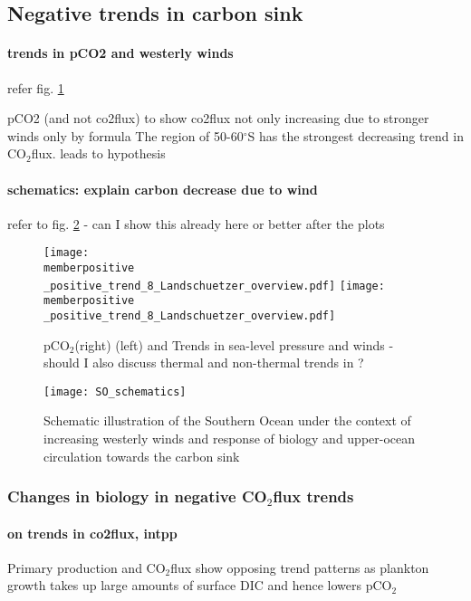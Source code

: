 \documentclass[12pt]{article}
\newcommand{\memberpositive}{m178_1985_1992} %
\begin{document}
\clearpage

\subsection{Negative trends in carbon sink}


\paragraph{trends in pCO2 and westerly winds} refer fig. \ref{fig:pco2_neg} 

pCO2 (and not co2flux) to show co2flux not only increasing due to stronger winds only by formula
 The region of 50-60$^\circ$S has the strongest decreasing trend in CO$_2$flux. leads to hypothesis
 
\paragraph{schematics: explain carbon decrease due to wind} refer to fig. \ref{fig:schematics_stronger_winds} - can I show this already here or better after the plots 



\begin{figure}[h!]
\centering
	\texttt{[image: \\memberpositive \_positive\_trend\_8\_Landschuetzer\_overview.pdf]}
	\texttt{[image: \\memberpositive \_positive\_trend\_8\_Landschuetzer\_overview.pdf]}	
	\caption{pCO$_2$(right) (left) and Trends in sea-level pressure and winds - should I also discuss thermal and non-thermal trends in \citep{landschuetzer2015}?}
	\label{fig:pco2_neg}
\end{figure}




\begin{figure}[h!]
	\centering
	\texttt{[image: SO\_schematics]}
	\caption{Schematic illustration of the Southern Ocean under the context of increasing westerly winds and response of biology and upper-ocean circulation towards the carbon sink}
	\label{fig:schematics_stronger_winds}
\end{figure}


\subsubsection{Changes in biology in negative CO$_2$flux trends}

\paragraph{on trends in co2flux, intpp} Primary production and CO$_2$flux show opposing trend patterns as plankton growth takes up large amounts of surface DIC and hence lowers pCO$_2$
\end{document}
